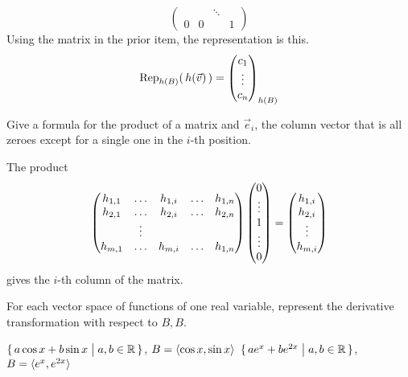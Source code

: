 \begin{exercises}
\begin{answer}
\begin{exparts}
\begin{equation*}
\begin{pmatrix}
                  &   &\ddots      \\
               0  &0  &        &1 
            \end{pmatrix}
          \end{equation*}
        \partsitem Using the matrix in the prior item, 
          the representation is this.
          \begin{equation*}
            \rep{\,h(\vec{v})\,}{h(B)}
             =\colvec{c_1 \\ \vdots \\ c_n}_{h(B)}
          \end{equation*}
        \end{exparts}  
     \end{answer}
  \item 
    Give a formula for the product of a matrix and \( \vec{e}_i \), the
    column vector that is all zeroes except for a single one in the \( i \)-th
    position.
    \begin{answer}
      The product
      \begin{equation*}
        \begin{pmatrix}
          h_{1,1} &\ldots  &h_{1,i} &\ldots &h_{1,n}  \\
          h_{2,1} &\ldots  &h_{2,i} &\ldots &h_{2,n}  \\
                  &\vdots                             \\
          h_{m,1} &\ldots  &h_{m,i} &\ldots &h_{1,n}
        \end{pmatrix}
        \colvec{0 \\ \vdots \\ 1 \\ \vdots \\ 0}
        =
        \colvec{h_{1,i} \\ h_{2,i} \\ \vdots \\ h_{m,i}}
      \end{equation*}
      gives the \( i \)-th column of the matrix.  
    \end{answer}
  \recommended \item 
    For each vector space of functions of one real variable,
    represent the derivative transformation with respect to \( B,B \).
    \begin{exparts}
      \partsitem \( \set{a\cos x+b\sin x \suchthat a,b\in\Re} \),
         \( B=\sequence{\cos x,\sin x} \)
      \partsitem \( \set{ae^x+be^{2x} \suchthat a,b\in\Re} \),
         \( B=\sequence{e^x,e^{2x}} \)

\end{exparts}
\end{exercises}
